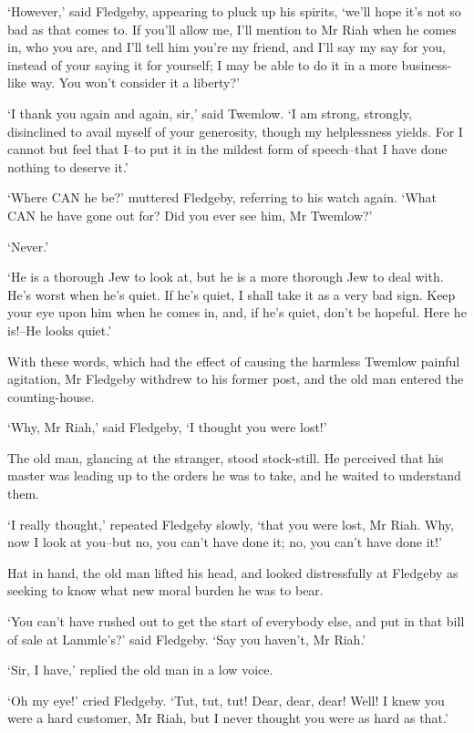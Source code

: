 ‘However,’ said Fledgeby, appearing to pluck up his spirits, ‘we’ll hope
it’s not so bad as that comes to. If you’ll allow me, I’ll mention to Mr
Riah when he comes in, who you are, and I’ll tell him you’re my friend,
and I’ll say my say for you, instead of your saying it for yourself; I
may be able to do it in a more business-like way. You won’t consider it
a liberty?’

‘I thank you again and again, sir,’ said Twemlow. ‘I am strong,
strongly, disinclined to avail myself of your generosity, though my
helplessness yields. For I cannot but feel that I--to put it in the
mildest form of speech--that I have done nothing to deserve it.’

‘Where CAN he be?’ muttered Fledgeby, referring to his watch again.
‘What CAN he have gone out for? Did you ever see him, Mr Twemlow?’

‘Never.’

‘He is a thorough Jew to look at, but he is a more thorough Jew to deal
with. He’s worst when he’s quiet. If he’s quiet, I shall take it as a
very bad sign. Keep your eye upon him when he comes in, and, if he’s
quiet, don’t be hopeful. Here he is!--He looks quiet.’

With these words, which had the effect of causing the harmless Twemlow
painful agitation, Mr Fledgeby withdrew to his former post, and the old
man entered the counting-house.

‘Why, Mr Riah,’ said Fledgeby, ‘I thought you were lost!’

The old man, glancing at the stranger, stood stock-still. He perceived
that his master was leading up to the orders he was to take, and he
waited to understand them.

‘I really thought,’ repeated Fledgeby slowly, ‘that you were lost, Mr
Riah. Why, now I look at you--but no, you can’t have done it; no, you
can’t have done it!’

Hat in hand, the old man lifted his head, and looked distressfully at
Fledgeby as seeking to know what new moral burden he was to bear.

‘You can’t have rushed out to get the start of everybody else, and put
in that bill of sale at Lammle’s?’ said Fledgeby. ‘Say you haven’t, Mr
Riah.’

‘Sir, I have,’ replied the old man in a low voice.

‘Oh my eye!’ cried Fledgeby. ‘Tut, tut, tut! Dear, dear, dear! Well! I
knew you were a hard customer, Mr Riah, but I never thought you were as
hard as that.’

